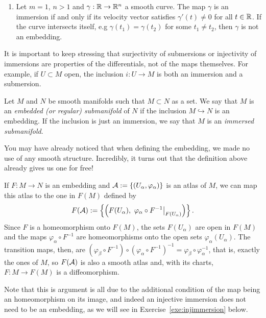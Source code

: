 \begin{example}
\begin{enumerate}
		\item Let $m=1$, $n > 1$ and $\gamma:\mathbb{R}\to\mathbb{R}^n$ a smooth curve.
		      The map $\gamma$ is an immersion if and only if its velocity vector satisfies $\gamma'(t)\neq0$ for all $t\in\mathbb{R}$.
		      If the curve intersects itself, e.g $\gamma(t_1) = \gamma(t_2)$ for some $t_1\neq t_2$, then $\gamma$ is not an embedding.
	\end{enumerate}
\end{example}

\begin{remark}
	It is important to keep stressing that surjectivity of submersions or injectivity of immersions are properties of the differentials, not of the maps themselves.
	For example, if $U\subset M$ open, the inclusion $i: U \to M$ is both an immersion and a submersion.
\end{remark}

\begin{definition}
	Let $M$ and $N$ be smooth manifolds such that $M\subset N$ as a set.
	We say that $M$ is an \emph{embedded (or regular) submanifold} of $N$ if the inclusion $M\hookrightarrow N$ is an embedding. If the inclusion is just an immersion, we say that $M$ is an \emph{immersed submanifold}.
\end{definition}

You may have already noticed that when defining the embedding, we made no use of any smooth structure. Incredibly, it turns out that the definition above already gives us one for free!

If $F:M\to N$ is an embedding and $\mathcal{A}:=\{(U_\alpha,\varphi_\alpha)\}$ is an atlas of $M$, we can map this atlas to the one in $F(M)$ defined by
\begin{equation}
	F(\mathcal{A}) := \left\{\left(F(U_\alpha),\ \varphi_\alpha\circ F^{-1}\big|_{F(U_\alpha)}\right)\right\}.
\end{equation}
Since $F$ is a homeomorphism onto $F(M)$, the sets $F(U_\alpha)$ are open in $F(M)$ and the maps $\varphi_\alpha\circ F^{-1}$ are homeomorphisms onto the open sets $\varphi_\alpha(U_\alpha)$.
The transition maps, then, are $(\varphi_\beta\circ F^{-1})\circ(\varphi_\alpha\circ F^{-1})^{-1} = \varphi_\beta\circ\varphi_\alpha^{-1}$, that is, exactly the ones of $M$, so $F(\mathcal{A})$ is also a smooth atlas and, with its charts, $F:M\to F(M)$ is a diffeomorphism.

Note that this is argument is all due to the additional condition of the map being an homeomorphism on its image, and indeed an injective immersion does not need to be an embedding, as we will see in Exercise~\ref{exe:injimmersion} below.

